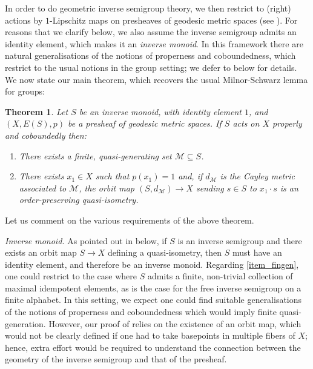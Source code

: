 \documentclass[svgnames]{amsart}
\theoremstyle{plain}
\newtheorem{thmintro}{Theorem}
\theoremstyle{definition}
\begin{document}
In order to do geometric inverse semigroup theory, we then restrict to (right) actions by $1$-Lipschitz maps on presheaves of geodesic metric spaces (see ). For reasons that we clarify below, we also assume the inverse semigroup admits an identity element, which makes it an \emph{inverse monoid}. In this framework there are natural generalisations of the notions of properness and coboundedness, which restrict to the usual notions in the group setting; we defer to  below for details. We now state our main theorem, which recovers the usual Milnor-Schwarz lemma for groups:
\begin{thmintro}\label{thmintro}
	Let $S$ be an inverse monoid, with identity element $1$, and $(X, E(S),p)$ be a presheaf of geodesic metric spaces. If $S$ acts on $X$ properly and coboundedly then:
    \begin{enumerate}
        \item\label{item_fingen} There exists a finite, quasi-generating set $\mathcal{M}\subseteq S$.
        \item There exists $x_1\in X$ such that $p(x_1)=1$ and, if $d_{\mathcal{M}}$ is the Cayley metric associated to $\mathcal{M}$, the orbit map $(S,d_{\mathcal{M}})\to X$ sending $s\in S$ to $x_1\cdot s$ is an order-preserving quasi-isometry.
    \end{enumerate}
\end{thmintro}

\noindent Let us comment on the various requirements of the above theorem. 

\textit{Inverse monoid.} As pointed out in  below, if $S$ is an inverse semigroup and there exists an orbit map $S\to X$ defining a quasi-isometry, then $S$ must have an identity element, and therefore be an inverse monoid. Regarding \eqref{item_fingen}, one could restrict to the case where $S$ admits a finite, non-trivial collection of maximal idempotent elements, as is the case for the free inverse semigroup on a finite alphabet. In this setting, we expect one could find suitable generalisations of the notions of properness and coboundedness which would imply finite quasi-generation. However, our proof of  relies on the existence of an orbit map, which would not be clearly defined if one had to take basepoints in multiple fibers of $X$; hence, extra effort would be required to understand the connection between the geometry of the inverse semigroup and that of the presheaf.
\end{document}

